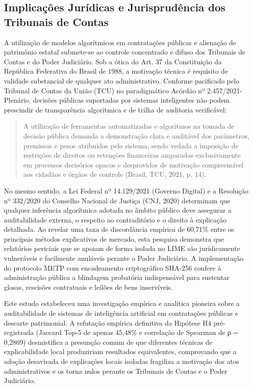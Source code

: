 \documentclass[12pt,a4paper]{article}
\begin{document}
\subsection{Implicações Jurídicas e Jurisprudência dos Tribunais de Contas}

A utilização de modelos algorítmicos em contratações públicas e alienação de patrimônio estatal submete-se ao controle concentrado e difuso dos Tribunais de Contas e do Poder Judiciário. Sob a ótica do Art. 37 da Constituição da República Federativa do Brasil de 1988, a motivação técnica é requisito de validade substancial de qualquer ato administrativo. Conforme pacificado pelo Tribunal de Contas da União (TCU) no paradigmático Acórdão nº 2.457/2021-Plenário, decisões públicas suportadas por sistemas inteligentes não podem prescindir de transparência algorítmica e de trilha de auditoria verificável:

\begin{quote}
\small A utilização de ferramentas automatizadas e algoritmos na tomada de decisão pública demanda a demonstração clara e auditável dos parâmetros, premissas e pesos atribuídos pelo sistema, sendo vedada a imposição de restrições de direitos ou retenções financeiras amparadas exclusivamente em processos decisórios opacos e desprovidos de motivação compreensível aos cidadãos e órgãos de controle (Brasil, TCU, 2021, p. 14).
\end{quote}

No mesmo sentido, a Lei Federal nº 14.129/2021 (Governo Digital) e a Resolução nº 332/2020 do Conselho Nacional de Justiça (CNJ, 2020) determinam que qualquer inferência algorítmica adotada no âmbito público deve assegurar a auditabilidade externa, o respeito ao contraditório e o direito à explicação detalhada. Ao revelar uma taxa de discordância empírica de 60,71\% entre os principais métodos explicativos de mercado, esta pesquisa demonstra que relatórios periciais que se apoiam de forma isolada no LIME são juridicamente vulneráveis e facilmente anuláveis perante o Poder Judiciário. A implementação do protocolo METP com encadeamento criptográfico SHA-256 confere à administração pública a blindagem probatória indispensável para sustentar glosas, rescisões contratuais e leilões de bens inservíveis.

Este estudo estabeleceu uma investigação empírica e analítica pioneira sobre a auditabilidade de sistemas de inteligência artificial em contratações públicas e descarte patrimonial. A refutação empírica definitiva da Hipótese H4 pré-registrada (Jaccard Top-5 de apenas 45,48\% e correlação de Spearman de ρ = 0,2869) desmistifica a presunção comum de que diferentes técnicas de explicabilidade local produziriam resultados equivalentes, comprovando que a adoção desavisada de explicações locais isoladas fragiliza a motivação dos atos administrativos e os torna nulos perante os Tribunais de Contas e o Poder Judiciário.
\end{document}
